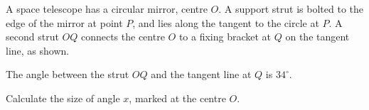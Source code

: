 \begin{question}
\noindent A space telescope has a circular mirror, centre $O$. A support strut is bolted to the edge of the mirror at point $P$, and lies along the tangent to the circle at $P$. A second strut $OQ$ connects the centre $O$ to a fixing bracket at $Q$ on the tangent line, as shown.

\begin{center}
\end{center}

\noindent The angle between the strut $OQ$ and the tangent line at $Q$ is $34^\circ$.

\noindent Calculate the size of angle $x$, marked at the centre $O$.

\vspace{4cm}

\begin{flushright}
\end{flushright}
\end{question}
